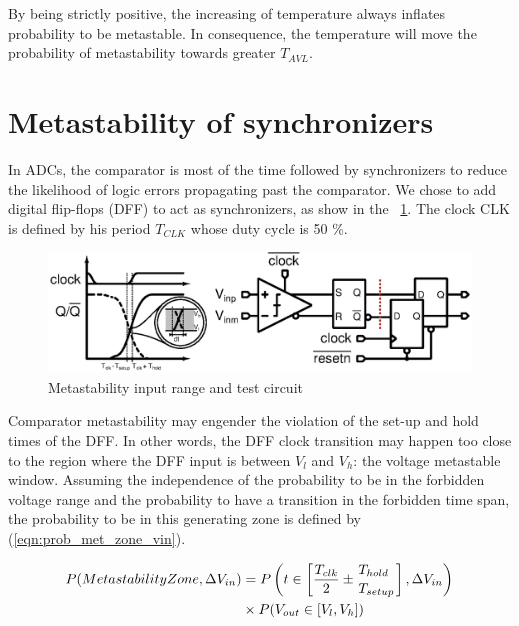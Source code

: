 By being strictly positive, the increasing of temperature always inflates probability to be metastable. In consequence, the temperature will move the probability of metastability towards greater $T_{AVL}$.

\section{Metastability of synchronizers}
In ADCs\@, the comparator is most of the time followed by synchronizers to reduce the likelihood of logic errors propagating past the comparator. We chose to add digital flip-flops (DFF) to act as synchronizers, as show in the \figurename~\ref{fig:metastable_rng}. The clock CLK is defined by his period $T_{CLK}$ whose duty cycle is 50 \%.

\begin{figure}[htp]
\centering
\includegraphics[width=\textwidth]{Appendix3/Figs/comp-metastability-window.ps}
\caption{Metastability input range and test circuit}
\label{fig:metastable_rng}
\end{figure}

Comparator metastability may engender the violation of the set-up and hold times of the DFF\@. In other words, the DFF clock transition may happen too close to the region where the DFF input is between $V_{l}$ and $V_{h}$: the voltage metastable window. Assuming the independence of the probability to be in the forbidden voltage range and the probability to have a transition in the forbidden time span, the probability to be in this generating zone is defined by (\ref{eqn:prob_met_zone_vin}).

\begin{align}
P(Metastability Zone, \Delta V_{in}) &=
P\left(t \in \left[\frac{T_{clk}}{2} \pm \myatop{T_{hold}}{T_{setup}} \right], \Delta V_{in}\right) \nonumber \\
&\times P(V_{out} \in [V_l, V_h])
\label{eqn:prob_met_zone_vin}
\end{align}

